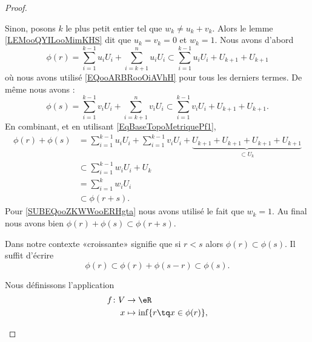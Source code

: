 \begin{proof}
\begin{subproof}
\begin{subproof}
\begin{subproof}
				Sinon, posons \(k \) le plus petit entier tel que \( w_k \neq u_k + v_k\). Alors le lemme \ref{LEMooQYILooMimKHS} dit que \( u_k=v_k=0\) et \( w_k=1\). Nous avons d'abord
				\begin{equation}
					\phi(r) = \sum_{i=1}^{k-1} u_i U_i + \sum_{i=k+1}^n u_i U_i \subset \sum_{i=1}^{k-1} u_i U_i + U_{k+1}+ U_{k+1}
				\end{equation}
				où nous avons utilisé \eqref{EQooARBRooOiAVhH} pour tous les derniers termes. De même nous avons :
				\begin{equation}
					\phi(s) = \sum_{i=1}^{k-1} v_i U_i + \sum_{i=k+1}^n v_i U_i \subset \sum_{i=1}^{k-1} v_i U_i + U_{k+1}+ U_{k+1}.
				\end{equation}
				En combinant, et en utilisant \eqref{EqBaseTopoMetriquePf1},
				\begin{subequations}
					\begin{align}
						\phi(r)+\phi(s) & = \sum_{i=1}^{k-1} u_i U_i + \sum_{i=1}^{k-1} v_i U_i +\underbrace{U_{k+1}+ U_{k+1} + U_{k+1}+ U_{k+1}}_{\subset U_k} \\
						                & \subset \sum_{i=1}^{k-1} w_i U_i + U_k                                                                                \\
						                & = \sum_{i=1}^{k} w_i U_i       \label{SUBEQooZKWWooERHgta}                                                            \\
						                & \subset \phi(r+s).
					\end{align}
				\end{subequations}
				Pour \eqref{SUBEQooZKWWooERHgta} nous avons utilisé le fait que \( w_k=1\). Au final nous avons bien \( \phi(r)+\phi(s)\subset\phi(r+s)\).
			\end{subproof}
			Dans notre contexte «croissante» signifie que si \(r < s \) alors \( \phi(r) \subset \phi(s) \). Il suffit d'écrire
			\begin{equation}
				\phi(r) \subset \phi(r) + \phi(s-r) \subset \phi(s).
			\end{equation}
		\end{subproof}
		Nous définissons l'application
		\begin{equation}
			\begin{aligned}
				f\colon V & \to \eR                             \\
				x         & \mapsto \inf\{ r\tq x\in\phi(r) \},

\end{aligned}
\end{equation}
\end{subproof}
\end{proof}
